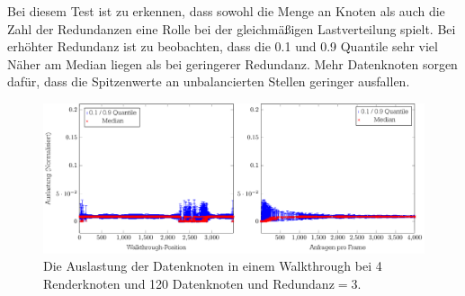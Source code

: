 Bei diesem Test ist zu erkennen, dass sowohl die Menge an Knoten als auch die Zahl der Redundanzen eine Rolle bei der gleichmäßigen Lastverteilung spielt. Bei erhöhter Redundanz ist zu beobachten, dass die 0.1 und 0.9 Quantile sehr viel Näher am Median liegen als bei geringerer Redundanz. Mehr Datenknoten sorgen dafür, dass die Spitzenwerte an unbalancierten Stellen geringer ausfallen.

\begin{figure}
\centering
\includegraphics[scale=0.75]{images/diag_cCol_red3_render4_data120_2x.pdf}
  \caption{\label{fig:eval:cCol9}Die Auslastung der Datenknoten in einem Walkthrough bei 4 Renderknoten und 120 Datenknoten und Redundanz$=$3.}
\end{figure}
